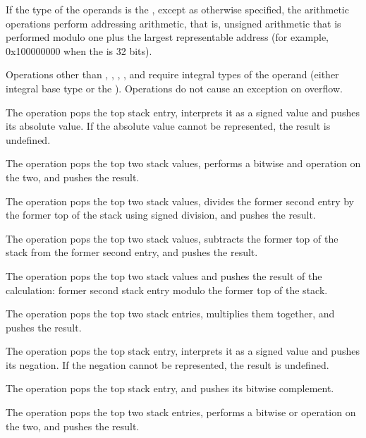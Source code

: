 If the type of the operands is the \specialaddresstype, 
except as otherwise specified, the arithmetic operations
perform addressing arithmetic, that is, unsigned arithmetic that is performed
modulo one plus the largest representable address (for example, 0x100000000
when the  is 32 bits). 

Operations other than \DWOPabs{},
\DWOPdiv{}, \DWOPminus{}, \DWOPmul{}, \DWOPneg{} and \DWOPplus{} 
require integral types of the operand (either integral base type 
or the \specialaddresstype).  Operations do not cause an exception 
on overflow.

\begin{enumerate}[1. ]
\itembfnl{\DWOPabsTARG}
The \DWOPabsTARG{} operation pops the top stack entry, interprets
it as a signed value and pushes its absolute value. If the
absolute value cannot be represented, the result is undefined.

\itembfnl{\DWOPandTARG}
The \DWOPandTARG{} operation pops the top two stack values, performs
a bitwise and operation on the two, and pushes the result.

\itembfnl{\DWOPdivTARG}
The \DWOPdivTARG{} operation pops the top two stack values, divides the former second entry by
the former top of the stack using signed division, and pushes the result.

\itembfnl{\DWOPminusTARG}
The \DWOPminusTARG{} operation pops the top two stack values, subtracts the former top of the
stack from the former second entry, and pushes the result.

\itembfnl{\DWOPmodTARG}
The \DWOPmodTARG{} operation pops the top two stack values and pushes the result of the
calculation: former second stack entry modulo the former top of the stack.

\itembfnl{\DWOPmulTARG}
The \DWOPmulTARG{} operation pops the top two stack entries, multiplies them together, and
pushes the result.

\itembfnl{\DWOPnegTARG}
The \DWOPnegTARG{} operation pops the top stack entry, interprets
it as a signed value and pushes its negation. If the negation
cannot be represented, the result is undefined.

\itembfnl{\DWOPnotTARG}
The \DWOPnotTARG{} operation pops the top stack entry, and pushes
its bitwise complement.

\itembfnl{\DWOPorTARG}
The \DWOPorTARG{} operation pops the top two stack entries, performs
a bitwise or operation on the two, and pushes the result.


\end{enumerate}
